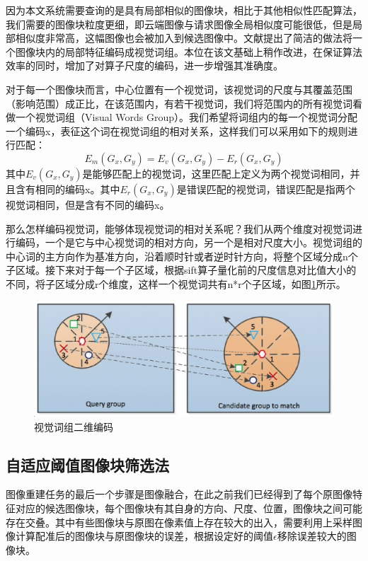 因为本文系统需要查询的是具有局部相似的图像块，相比于其他相似性匹配算法，我们需要的图像块粒度更细，即云端图像与请求图像全局相似度可能很低，但是局部相似度非常高，这幅图像也会被加入到候选图像中。文献\cite{Dai:2012vn}提出了简洁的做法将一个图像块内的局部特征编码成视觉词组。本位在该文基础上稍作改进，在保证算法效率的同时，增加了对算子尺度的编码，进一步增强其准确度。

对于每一个图像块而言，中心位置有一个视觉词，该视觉词的尺度与其覆盖范围（影响范围）成正比，在该范围内，有若干视觉词，我们将范围内的所有视觉词看做一个视觉词组（Visual Words Group）。我们希望将词组内的每一个视觉词分配一个编码x，表征这个词在视觉词组的相对关系，这样我们可以采用如下的规则进行匹配：
\begin{equation}
E_m(G_x,G_y) = E_v(G_x,G_y) - E_r(G_x,G_y)
\end{equation}
其中\(E_v(G_x,G_y)\)是能够匹配上的视觉词，这里匹配上定义为两个视觉词相同，并且含有相同的编码x。其中\(E_r(G_x,G_y)\)是错误匹配的视觉词，错误匹配是指两个视觉词相同，但是含有不同的编码x。

那么怎样编码视觉词，能够体现视觉词的相对关系呢？我们从两个维度对视觉词进行编码，一个是它与中心视觉词的相对方向，另一个是相对尺度大小。视觉词组的中心词的主方向作为基准方向，沿着顺时针或者逆时针方向，将整个区域分成n个子区域。接下来对于每一个子区域，根据sift算子量化前的尺度信息对比值大小的不同，将子区域分成r个维度，这样一个视觉词共有n*r个子区域，如图\ref{fig:visual_group}所示。

\begin{figure}
\centering\includegraphics[width=15.00cm]{imgs/ch3/visual_group}
\caption{视觉词组二维编码}
\label{fig:visual_group}
\end{figure}

\subsection{自适应阈值图像块筛选法}
图像重建任务的最后一个步骤是图像融合，在此之前我们已经得到了每个原图像特征对应的候选图像块，每个图像块有其自身的方向、尺度、位置，图像块之间可能存在交叠。其中有些图像块与原图在像素值上存在较大的出入，需要利用上采样图像计算配准后的图像块与原图像块的误差，根据设定好的阈值\(\epsilon\)移除误差较大的图像块。

